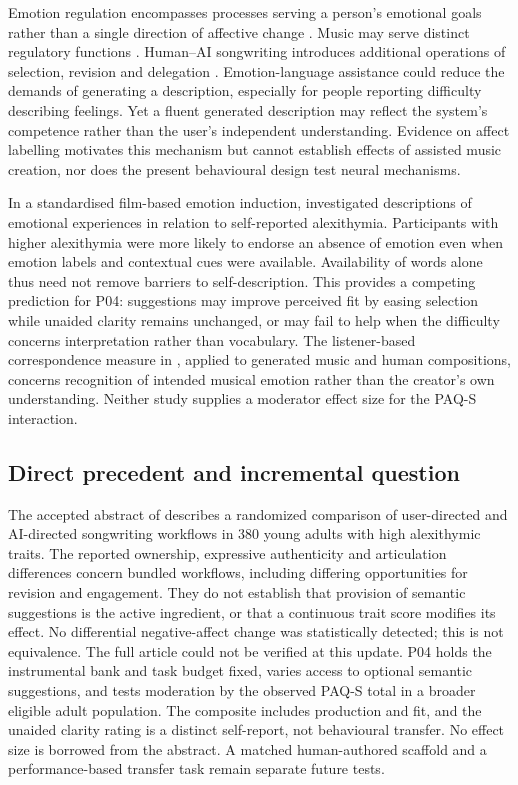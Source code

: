 \documentclass[11pt,a4paper]{article}
\begin{document}
Emotion regulation encompasses processes serving a person's emotional goals rather than a single direction of affective change \parencite{gross2015}. Music may serve distinct regulatory functions \parencite{saarikallio2007}. Human--AI songwriting introduces additional operations of selection, revision and delegation \parencite{huang2020}. Emotion-language assistance could reduce the demands of generating a description, especially for people reporting difficulty describing feelings. Yet a fluent generated description may reflect the system's competence rather than the user's independent understanding. Evidence on affect labelling \parencite{lieberman2007} motivates this mechanism but cannot establish effects of assisted music creation, nor does the present behavioural design test neural mechanisms.

In a standardised film-based emotion induction, \textcite{aaron2018} investigated descriptions of emotional experiences in relation to self-reported alexithymia. Participants with higher alexithymia were more likely to endorse an absence of emotion even when emotion labels and contextual cues were available. Availability of words alone thus need not remove barriers to self-description. This provides a competing prediction for P04: suggestions may improve perceived fit by easing selection while unaided clarity remains unchanged, or may fail to help when the difficulty concerns interpretation rather than vocabulary. The listener-based correspondence measure in \textcite{qi2026}, applied to generated music and human compositions, concerns recognition of intended musical emotion rather than the creator's own understanding. Neither study supplies a moderator effect size for the PAQ-S interaction.

\subsection{Direct precedent and incremental question}
The accepted abstract of \textcite{zhang2026workflow} describes a randomized comparison of user-directed and AI-directed songwriting workflows in 380 young adults with high alexithymic traits. The reported ownership, expressive authenticity and articulation differences concern bundled workflows, including differing opportunities for revision and engagement. They do not establish that provision of semantic suggestions is the active ingredient, or that a continuous trait score modifies its effect. No differential negative-affect change was statistically detected; this is not equivalence. The full article could not be verified at this update. P04 holds the instrumental bank and task budget fixed, varies access to optional semantic suggestions, and tests moderation by the observed PAQ-S total in a broader eligible adult population. The composite includes production and fit, and the unaided clarity rating is a distinct self-report, not behavioural transfer. No effect size is borrowed from the abstract. A matched human-authored scaffold and a performance-based transfer task remain separate future tests.
\end{document}
